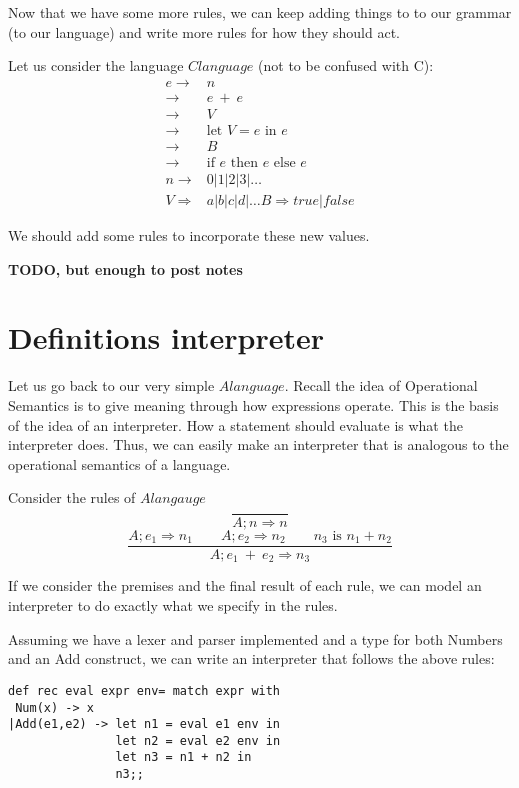 \documentclass[main.tex]{subfiles}
\begin{document}
Now that we have some more rules, we can keep adding things to to our grammar (to our language) and write more rules for how they should act. 

Let us consider the language $Clanguage$ (not to be confused with C):
$$\begin{array}{rl}
e \rightarrow & n\\
\rightarrow & e\ +\ e\\
\rightarrow & V\\
\rightarrow & \text{let }V = e \text{ in } e\\ 
\rightarrow & B\\
\rightarrow & \text{if }e \text{ then } e \text{ else } e\\
n \rightarrow & 0|1|2|3|\dots\\
V \Rightarrow & a|b|c|d|\dots
B \Rightarrow true|false
\end{array}$$

We should add some rules to incorporate these new values. 

\textbf{TODO, but enough to post notes}

\section{Definitions interpreter}
Let us go back to our very simple $Alanguage$. Recall the idea of Operational Semantics is to give meaning through how expressions operate. This is the basis of the idea of an interpreter. How a statement should evaluate is what the interpreter does. Thus, we can easily make an interpreter that is analogous to the operational semantics of a language. 

Consider the rules of $Alangauge$
$$\frac{}{A;n \Rightarrow n}$$
$$
\frac{A;e_1 \Rightarrow n_1 \qquad A;e_2 \Rightarrow n_2 \qquad n_3 \text{ is } n_1 + n_2}{A;e_1\ +\ e_2 \Rightarrow n_3}
$$

If we consider the premises and the final result of each rule, we can model an interpreter to do exactly what we specify in the rules.

Assuming we have a lexer and parser implemented and a type for both Numbers and an Add construct, we can write an interpreter that follows the above rules:
\begin{lstlisting}[style=Myocamlstyle]
def rec eval expr env= match expr with
 Num(x) -> x 
|Add(e1,e2) -> let n1 = eval e1 env in 
               let n2 = eval e2 env in 
               let n3 = n1 + n2 in 
               n3;;
\end{lstlisting}
\end{document}
